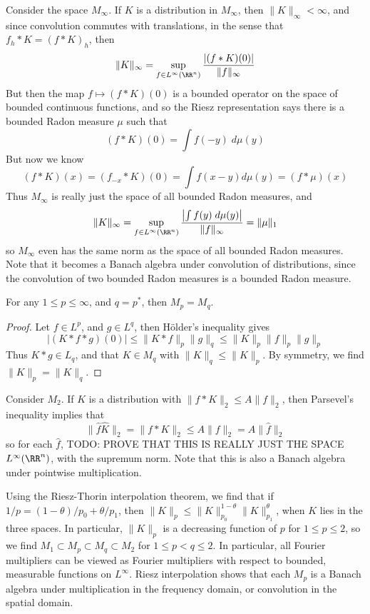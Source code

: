 \begin{example}
	Consider the space $M_\infty$. If $K$ is a distribution in $M_\infty$, then $\| K \|_\infty < \infty$, and since convolution commutes with translations, in the sense that $f_h * K = (f * K)_h$, then
	\[ \| K \|_\infty = \sup_{f \in L^\infty(\RR^n)} \frac{|(f * K)(0)|}{\| f \|_\infty} \]
	But then the map $f \mapsto (f * K)(0)$ is a bounded operator on the space of bounded continuous functions, and so the Riesz representation says there is a bounded Radon measure $\mu$ such that
	\[ (f * K)(0) = \int f(-y)\; d\mu(y) \]
	But now we know
	\[ (f * K)(x) = (f_{-x} * K)(0) = \int f(x - y) d\mu(y) = (f * \mu)(x) \]
	Thus $M_\infty$ is really just the space of all bounded Radon measures, and
	\[ \| K \|_\infty = \sup_{f \in L^\infty(\RR^n)} \frac{\left| \int f(y)\; d\mu(y) \right|}{\| f \|_\infty} = \| \mu \|_1 \]
	so $M_\infty$ even has the same norm as the space of all bounded Radon measures. Note that it becomes a Banach algebra under convolution of distributions, since the convolution of two bounded Radon measures is a bounded Radon measure.
\end{example}

\begin{theorem}
	For any $1 \leq p \leq \infty$, and $q = p^*$, then $M_p = M_q$.
\end{theorem}
\begin{proof}
	Let $f \in L^p$, and $g \in L^q$, then H\"{o}lder's inequality gives
	\[ |(K * f * g)(0)| \leq \| K * f \|_p \| g \|_q \leq \| K \|_p \| f \|_p \| g \|_p \]
	Thus $K * g \in L_q$, and that $K \in M_q$ with $\| K \|_q \leq \| K \|_p$. By symmetry, we find $\| K \|_p = \| K \|_q$.
\end{proof}

\begin{example}
	Consider $M_2$. If $K$ is a distribution with $\| f * K \|_2 \leq A \| f \|_2$, then Parsevel's inequality implies that
	\[ \| \widehat{f} \widehat{K} \|_2 = \| f * K \|_2 \leq A \| f \|_2 = A \| \widehat{f} \|_2 \]
	so for each $\widehat{f}$, TODO: PROVE THAT THIS IS REALLY JUST THE SPACE $L^\infty(\RR^n)$, with the supremum norm. Note that this is also a Banach algebra under pointwise multiplication.
\end{example}

Using the Riesz-Thorin interpolation theorem, we find that if $1/p = (1 - \theta)/p_0 + \theta/p_1$, then $\| K \|_p \leq \| K \|_{p_0}^{1 - \theta} \| K \|_{p_1}^\theta$, when $K$ lies in the three spaces. In particular, $\| K \|_p$ is a decreasing function of $p$ for $1 \leq p \leq 2$, so we find $M_1 \subset M_p \subset M_q \subset M_2$ for $1 \leq p < q \leq 2$. In particular, all Fourier multipliers can be viewed as Fourier multipliers with respect to bounded, measurable functions on $L^\infty$. Riesz interpolation shows that each $M_p$ is a Banach algebra under multiplication in the frequency domain, or convolution in the spatial domain.

